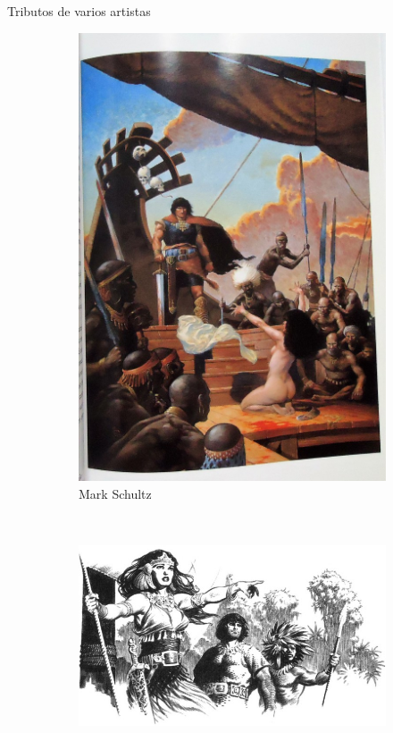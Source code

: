 \begin{frame}{Tributos de varios artistas}
	\begin{figure}[htp]
		\centering
		\begin{subfigure}[b]{0.22\textwidth}
			\includegraphics[width=\textwidth]{img/tributos/MarkSchultz2}
			\caption{Mark Schultz}
		\end{subfigure}
		~
		\begin{subfigure}[b]{0.4\textwidth}
			\includegraphics[width=\textwidth]{img/tributos/MarkSchultz}

\end{subfigure}
\end{figure}
\end{frame}

